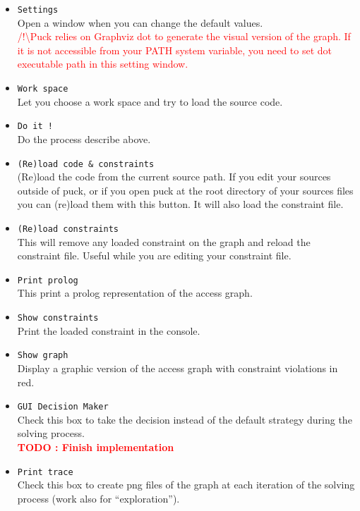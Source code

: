 \documentclass[]{article}
\newcommand{\todo}[1]{\textcolor{red}{\textbf{TODO : #1}}}
\newcommand{\important}[1]{\textcolor{red}{/!\textbackslash #1}}
\begin{document}
\begin{itemize}
	\item \verb|Settings|\\
	Open a window when you can change the default values.\\
	\important{Puck relies on Graphviz dot\cite{graphviz} to generate the visual version of the graph. If it is not accessible from your PATH system variable, you need to set dot executable path in this setting window.}
	
	\item \verb|Work space|\\
	Let you choose a work space and try to load the source code.
	
	\item \verb|Do it !|\\
	Do the process describe above.
	
	\item \verb|(Re)load code & constraints|\\
	(Re)load the code from the current source path. If you edit your sources outside of puck, or if you open puck at the root directory of your sources files you can (re)load them with this button. It will also load the constraint file.
	
	\item \verb|(Re)load constraints|\\
	This will remove any loaded constraint on the graph and reload the constraint file. Useful while you are editing your constraint file.
	
	\item \verb|Print prolog|\\
	This print a prolog representation of the access graph.
	
	\item \verb|Show constraints|\\
	Print the loaded constraint in the console.
	
	\item \verb|Show graph|\\
	Display a graphic version of the access graph with constraint violations in red.
	
	\item \verb|GUI Decision Maker|\\
	Check this box to take the decision instead of the default strategy during the solving process.\\
	\todo{Finish implementation}
	
	\item \verb|Print trace|\\
	Check this box to create png files of the graph at each iteration of the solving process (work also for ``exploration'').
	

\end{itemize}
\end{document}
